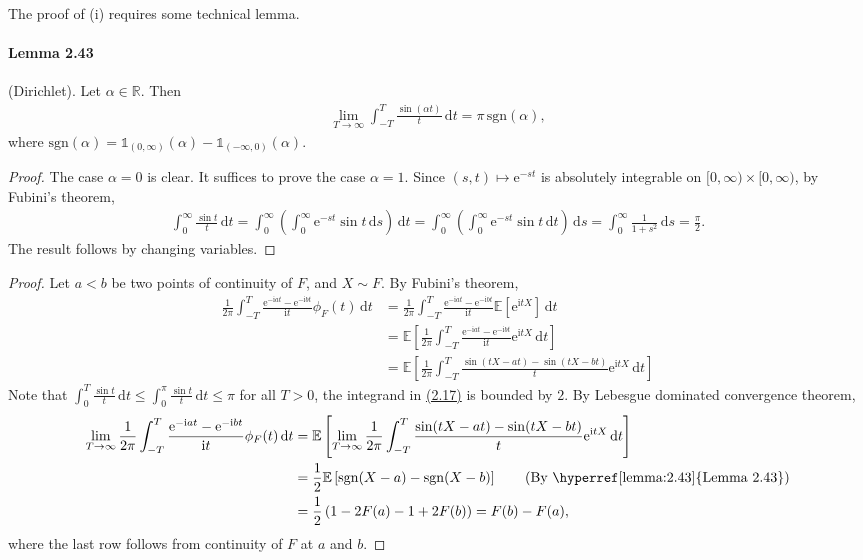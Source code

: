 \documentclass{article}
\numberwithin{equation}{section}
\newcommand{\e}{\mathrm{e}}
\newcommand{\E}{\mathbb{E}}
\renewcommand{\d}{\mathrm{d}}
\renewcommand{\i}{\mathrm{i}}
\renewcommand{\proofname}{\textit{Proof}}
\theoremstyle{plain}
\theoremstyle{definition}
\begin{document}
The proof of (i) requires some technical lemma.
\paragraph{Lemma 2.43\label{lemma:2.43}} (Dirichlet). Let $\alpha\in\mathbb{R}$. Then
\begin{align*}
	\lim_{T\to\infty}\int_{-T}^T\frac{\sin(\alpha t)}{t}\,\d t = \pi\,\mathrm{sgn}(\alpha),
\end{align*}
where $\mathrm{sgn}(\alpha)=\mathds{1}_{(0,\infty)}(\alpha)-\mathds{1}_{(-\infty,0)}(\alpha)$.
\begin{proof}
The case $\alpha=0$ is clear. It suffices to prove the case $\alpha=1$. Since $(s,t)\mapsto \e^{-st}$ is absolutely integrable on $[0,\infty)\times[0,\infty)$, by Fubini's theorem,
\begin{align*}
	\int_0^\infty\frac{\sin t}{t}\,\d t = \int_0^\infty\left(\int_0^\infty \e^{-st}\sin t\,\d s\right)\,\d t = \int_0^\infty\left(\int_0^\infty \e^{-st}\sin t\,\d t\right)\,\d s = \int_0^\infty\frac{1}{1+s^2}\,\d s = \frac{\pi}{2}.
\end{align*}
The result follows by changing variables.
\end{proof}
\renewcommand{\proofname}{Proof of \hyperref[thm:2.42]{Theorem 2.42 (i)}}
\begin{proof}
Let $a<b$ be two points of continuity of $F$, and $X\sim F$. By Fubini's theorem,
\begin{align*}
	\frac{1}{2\pi}\int_{-T}^T\frac{\e^{-\i at}-\e^{-\i bt}}{\i t}\phi_F(t)\,\d t &= \frac{1}{2\pi}\int_{-T}^T\frac{\e^{-\i at}-\e^{-\i bt}}{\i t}\E\left[\e^{\i tX}\right]\,\d t\\
	&= \E\left[\frac{1}{2\pi}\int_{-T}^T\frac{\e^{-\i at}-\e^{-\i bt}}{\i t}\e^{\i tX}\,\d t\right]\\
	&= \E\left[\frac{1}{2\pi}\int_{-T}^T\frac{\sin (tX-at) - \sin (tX-bt)}{t}\e^{\i tX}\,\d t\right]\tag{2.17}\label{eq:2.17}
\end{align*}
Note that $\int_0^T\frac{\sin t}{t}\,\d t\leq\int_0^{\pi}\frac{\sin t}{t}\,\d t\leq\pi$ for all $T>0$, the integrand in \hyperref[eq:2.17]{(2.17)} is bounded by $2$. By Lebesgue dominated convergence theorem,
\begin{align*}
	\lim_{T\to\infty}\frac{1}{2\pi}\int_{-T}^T\frac{\e^{-\i at}-\e^{-\i bt}}{\i t}\phi_F(t)\,\d t &= \E\left[\lim_{T\to\infty}\frac{1}{2\pi}\int_{-T}^T\frac{\sin (tX-at) - \sin (tX-bt)}{t}\e^{\i tX}\,\d t\right]\\
	&= \frac{1}{2}\E\left[\mathrm{sgn}(X-a)-\mathrm{sgn}(X-b)\right] \tag{By \hyperref[lemma:2.43]{Lemma 2.43}}\\
	&= \frac{1}{2}\left(1-2F(a) - 1 + 2F(b)\right) = F(b)-F(a),
\end{align*}
where the last row follows from continuity of $F$ at $a$ and $b$.
\end{proof}
\renewcommand{\proofname}{Proof}
\end{document}
